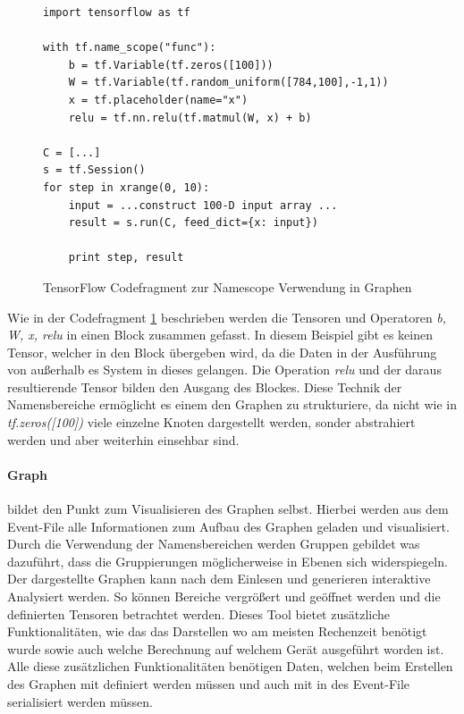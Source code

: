 \begin{figure}

\lstset{language=Python}
\begin{lstlisting}
import tensorflow as tf

with tf.name_scope("func"):
	b = tf.Variable(tf.zeros([100])) 
	W = tf.Variable(tf.random_uniform([784,100],-1,1)) 
	x = tf.placeholder(name="x") 
	relu = tf.nn.relu(tf.matmul(W, x) + b) 

C = [...] 
s = tf.Session()
for step in xrange(0, 10):
	input = ...construct 100-D input array ... 
	result = s.run(C, feed_dict={x: input}) 

	print step, result 
\end{lstlisting}

	\caption{TensorFlow Codefragment zur Namescope Verwendung in Graphen}
	\label{fig:NameScopeFragmentGraphDefinition}
\end{figure}
Wie in der Codefragment \ref{fig:NameScopeFragmentGraphDefinition} beschrieben werden die Tensoren und Operatoren \textit{b, W, x, relu} in einen Block zusammen gefasst. 
In diesem Beispiel gibt es keinen Tensor, welcher in den Block übergeben wird, da die Daten in der Ausführung von außerhalb es System in dieses gelangen. 
Die Operation \textit{relu} und der daraus resultierende Tensor bilden den Ausgang des Blockes. 
Diese Technik der Namensbereiche ermöglicht es einem den Graphen zu strukturiere, da nicht wie in \textit{tf.zeros([100])} viele einzelne Knoten dargestellt werden, sonder abstrahiert werden und aber weiterhin einsehbar sind.

\paragraph{Graph} bildet den Punkt zum Visualisieren des Graphen selbst. 
Hierbei werden aus dem Event-File alle Informationen zum Aufbau des Graphen geladen und visualisiert. 
Durch die Verwendung der Namensbereichen werden Gruppen gebildet was dazuführt, dass die Gruppierungen möglicherweise in Ebenen sich widerspiegeln. 
Der dargestellte Graphen kann nach dem Einlesen und generieren interaktive Analysiert werden. 
So können Bereiche vergrößert und geöffnet werden und die definierten Tensoren betrachtet werden. 
Dieses Tool bietet zusätzliche Funktionalitäten, wie das das Darstellen wo am meisten Rechenzeit benötigt wurde sowie auch welche Berechnung auf welchem Gerät ausgeführt worden ist. 
Alle diese zusätzlichen Funktionalitäten benötigen Daten, welchen beim Erstellen des Graphen mit definiert werden müssen und auch mit in des Event-File serialisiert werden müssen. 

